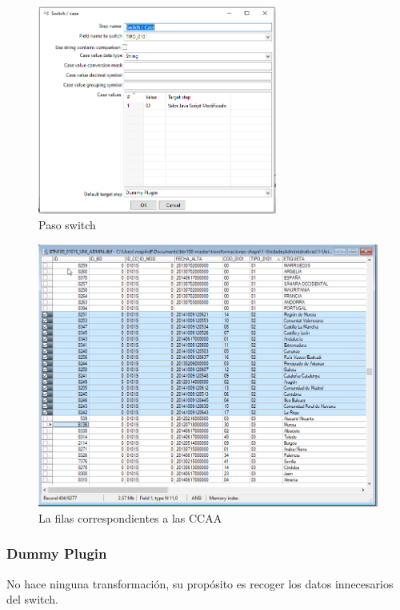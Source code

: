 \begin{figure}[h]
    \includegraphics[width=0.7\textwidth]{images/switch.png}
    \centering
    \caption{Paso switch}
    \label{fig:switch}
\end{figure}

\begin{figure}[h]
    \includegraphics[width=\textwidth]{images/tipo02.png}
    \centering
    \caption{La filas correspondientes a las CCAA}
    \label{fig:tipo02}
\end{figure}

\subsubsection{Dummy Plugin}
No hace ninguna transformación, su propósito es recoger los datos innecesarios del switch.

